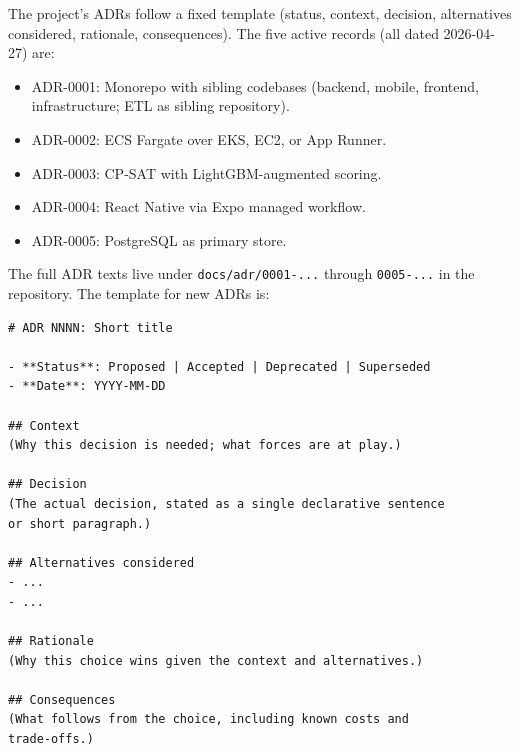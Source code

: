 The project's ADRs follow a fixed template (status, context, decision, alternatives considered, rationale, consequences). The five active records (all dated 2026-04-27) are:

\begin{itemize}
\item ADR-0001: Monorepo with sibling codebases (backend, mobile, frontend, infrastructure; ETL as sibling repository).
\item ADR-0002: ECS Fargate over EKS, EC2, or App Runner.
\item ADR-0003: CP-SAT with LightGBM-augmented scoring.
\item ADR-0004: React Native via Expo managed workflow.
\item ADR-0005: PostgreSQL as primary store.
\end{itemize}

The full ADR texts live under \texttt{docs/adr/0001-...} through \texttt{0005-...} in the repository. The template for new ADRs is:

\begin{lstlisting}[caption={ADR template used by the project.}]
# ADR NNNN: Short title

- **Status**: Proposed | Accepted | Deprecated | Superseded
- **Date**: YYYY-MM-DD

## Context
(Why this decision is needed; what forces are at play.)

## Decision
(The actual decision, stated as a single declarative sentence
or short paragraph.)

## Alternatives considered
- ...
- ...

## Rationale
(Why this choice wins given the context and alternatives.)

## Consequences
(What follows from the choice, including known costs and
trade-offs.)
\end{lstlisting}

\clearpage
